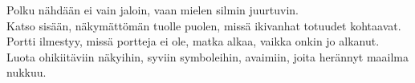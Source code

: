 \documentclass{article}
\begin{document}
\begin{infobox}
Polku nähdään ei vain jaloin, vaan mielen silmin juurtuvin.\\
Katso sisään, näkymättömän tuolle puolen, missä ikivanhat totuudet kohtaavat.\\
Portti ilmestyy, missä portteja ei ole, matka alkaa, vaikka onkin jo alkanut.\\
Luota ohikiitäviin näkyihin, syviin symboleihin, avaimiin, joita herännyt maailma nukkuu.\\
\end{infobox}
\end{document}
